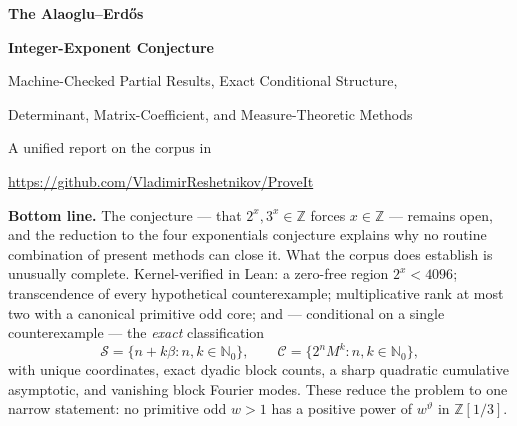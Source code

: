 \documentclass[11pt,oneside]{article}
\theoremstyle{definition}
\theoremstyle{remark}
\newcommand{\Nzero}{\mathbb N_0}
\newcommand{\Z}{\mathbb Z}
\newcommand{\thetaq}{\vartheta}
\newcommand{\Sol}{\mathcal S}
\newcommand{\Cand}{\mathcal C}
\newcommand{\Zthree}{\Z[1/3]}
\begin{document}

\begin{titlepage}
\centering
\vspace*{0.75cm}
{\Huge\bfseries The Alaoglu--Erd\H{o}s\par}
\vspace{0.2cm}
{\Huge\bfseries Integer-Exponent Conjecture\par}
\vspace{0.65cm}
{\LARGE Machine-Checked Partial Results, Exact Conditional Structure,\par}
\vspace{0.12cm}
{\LARGE Determinant, Matrix-Coefficient, and Measure-Theoretic Methods\par}
\vspace{1.0cm}
{\large A unified report on the corpus in\par}
\vspace{0.12cm}
{\large \url{https://github.com/VladimirReshetnikov/ProveIt}\par}
\vfill
\begin{minipage}{0.9\textwidth}
\small
\textbf{Bottom line.}
The conjecture --- that $2^x,3^x\in\Z$ forces $x\in\Z$ --- remains open, and the reduction to
the four exponentials conjecture explains why no routine combination of present methods can
close it.  What the corpus does establish is unusually complete.  Kernel-verified in Lean: a
zero-free region $2^x<4096$; transcendence of every hypothetical counterexample; multiplicative
rank at most two with a canonical primitive odd core; and --- conditional on a single
counterexample --- the \emph{exact} classification
\[
  \Sol=\{n+k\beta:n,k\in\Nzero\},
  \qquad
  \Cand=\{2^nM^k:n,k\in\Nzero\},
\]
with unique coordinates, exact dyadic block counts, a sharp quadratic cumulative asymptotic,
and vanishing block Fourier modes.  These reduce the problem to one narrow statement: no
primitive odd $w>1$ has a positive power of $w^{\thetaq}$ in $\Zthree$.


\end{minipage}
\end{titlepage}
\end{document}
